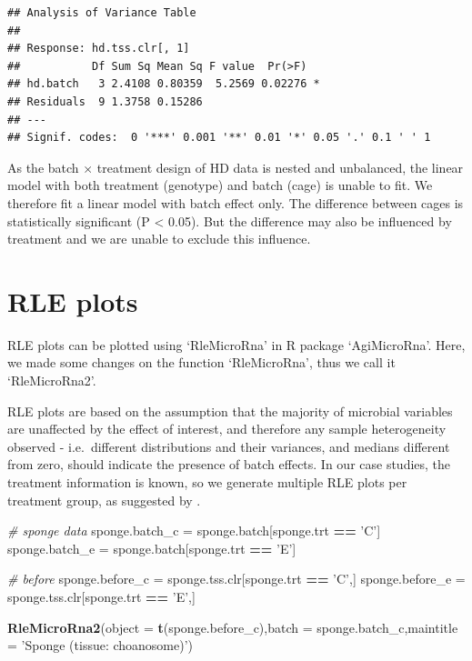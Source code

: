 \documentclass[]{book}
\newenvironment{Shaded}{\begin{snugshade}}{\end{snugshade}}
\newcommand{\KeywordTok}[1]{\textcolor[rgb]{0.13,0.29,0.53}{\textbf{#1}}}
\newcommand{\DataTypeTok}[1]{\textcolor[rgb]{0.13,0.29,0.53}{#1}}
\newcommand{\StringTok}[1]{\textcolor[rgb]{0.31,0.60,0.02}{#1}}
\newcommand{\CommentTok}[1]{\textcolor[rgb]{0.56,0.35,0.01}{\textit{#1}}}
\newcommand{\OperatorTok}[1]{\textcolor[rgb]{0.81,0.36,0.00}{\textbf{#1}}}
\newcommand{\NormalTok}[1]{#1}
\begin{document}
\begin{verbatim}
## Analysis of Variance Table
## 
## Response: hd.tss.clr[, 1]
##           Df Sum Sq Mean Sq F value  Pr(>F)  
## hd.batch   3 2.4108 0.80359  5.2569 0.02276 *
## Residuals  9 1.3758 0.15286                  
## ---
## Signif. codes:  0 '***' 0.001 '**' 0.01 '*' 0.05 '.' 0.1 ' ' 1
\end{verbatim}

As the batch \(\times\) treatment design of HD data is nested and
unbalanced, the linear model with both treatment (genotype) and batch
(cage) is unable to fit. We therefore fit a linear model with batch
effect only. The difference between cages is statistically significant
(P \textless{} 0.05). But the difference may also be influenced by
treatment and we are unable to exclude this influence.

\section{RLE plots}\label{rle-plots}

RLE plots can be plotted using `RleMicroRna' in R package `AgiMicroRna'.
Here, we made some changes on the function `RleMicroRna', thus we call
it `RleMicroRna2'.

RLE plots are based on the assumption that the majority of microbial
variables are unaffected by the effect of interest, and therefore any
sample heterogeneity observed - i.e.~different distributions and their
variances, and medians different from zero, should indicate the presence
of batch effects. In our case studies, the treatment information is
known, so we generate multiple RLE plots per treatment group, as
suggested by \citep{lin2018scmerge}.

\begin{Shaded}
\begin{Highlighting}[]
\CommentTok{# sponge data}
\NormalTok{sponge.batch_c =}\StringTok{ }\NormalTok{sponge.batch[sponge.trt }\OperatorTok{==}\StringTok{ 'C'}\NormalTok{]}
\NormalTok{sponge.batch_e =}\StringTok{ }\NormalTok{sponge.batch[sponge.trt }\OperatorTok{==}\StringTok{ 'E'}\NormalTok{] }

\CommentTok{# before}
\NormalTok{sponge.before_c =}\StringTok{ }\NormalTok{sponge.tss.clr[sponge.trt }\OperatorTok{==}\StringTok{ 'C'}\NormalTok{,]}
\NormalTok{sponge.before_e =}\StringTok{ }\NormalTok{sponge.tss.clr[sponge.trt }\OperatorTok{==}\StringTok{ 'E'}\NormalTok{,] }


\KeywordTok{RleMicroRna2}\NormalTok{(}\DataTypeTok{object =} \KeywordTok{t}\NormalTok{(sponge.before_c),}\DataTypeTok{batch =}\NormalTok{ sponge.batch_c,}\DataTypeTok{maintitle =} \StringTok{'Sponge (tissue: choanosome)'}\NormalTok{)}
\end{Highlighting}
\end{Shaded}
\end{document}
